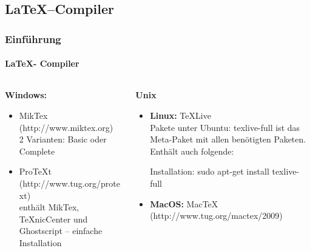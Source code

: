 \subsection{\LaTeX --Compiler}
\begin{frame}
\frametitle{Einf\"uhrung}
\framesubtitle{\LaTeX - Compiler}
\begin{columns}[t]
\begin{column}{.4\textwidth}
\textbf{Windows:}\\
\begin{itemize}
  \item MikTex (http://www.miktex.org)\\
   2 Varianten: Basic oder Complete
  \item ProTeXt (http://www.tug.org/protext)\\ 
   enthält MikTex, TeXnicCenter und Ghostscript – einfache Installation\\
\end{itemize}
\end{column}
\begin{column}{.6\textwidth}
\textbf{Unix}
\begin{itemize}
  \item \textbf{Linux:} TeXLive\\
Pakete unter Ubuntu: {\ttfamily texlive-full} ist das Meta-Paket mit allen
ben\"otigten Paketen. Enthält auch folgende:
Installation: {\ttfamily sudo apt-get install texlive-full}
\item \textbf{MacOS:} MacTeX (http://www.tug.org/mactex/2009)\\
\end{itemize}
\end{column}
\end{columns}
\end{frame}


